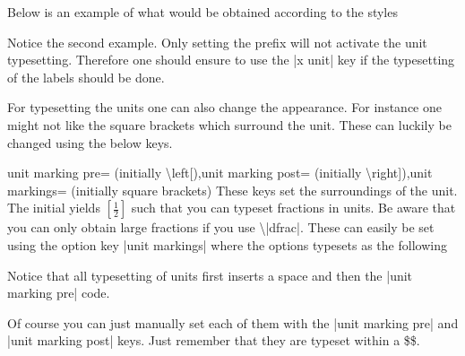Below is an example of what would be obtained according to the styles
\begin{codeexample}[code only]
\pgfplotsset{use units,x unit=T,xlabel=Temperature,ylabel=Nothing}
\pgfplotsset{use units,x unit prefix=m,xlabel=Temperature,ylabel=Nothing}
\end{codeexample}
Notice the second example. Only setting the prefix will not activate the unit typesetting. Therefore one should ensure to use the |x unit| key if the
typesetting of the labels should be done.

For typesetting the units one can also change the appearance. For instance one might not like the square brackets which surround the unit. These can
luckily be changed using the below keys.
\begin{pgfplotskeylist}{unit marking pre= (initially \textbackslash left[),unit marking post= (initially \textbackslash right]),unit markings= (initially square brackets)}
  These keys set the surroundings of the unit. The initial yields $\left[\frac{1}{2}\right]$ such that you can typeset fractions in units. Be aware that
  you can only obtain large fractions if you use \textbackslash|dfrac|. These can easily be set using the option key |unit markings| where the options typesets as the following
\begin{codeexample}
\pgfplotsset{x unit=T,unit markings=parenthesis} %
\pgfplotsset{x unit=T,unit markings=square brackets} %
\pgfplotsset{x unit=T,unit markings=slash space} %
\end{codeexample}
  Notice that all typesetting of units first inserts a space and then the |unit marking pre| code.

  Of course you can just manually set each of them with the |unit marking pre| and |unit marking post| keys. Just remember that they are typeset within a \$\$.
\end{pgfplotskeylist}


